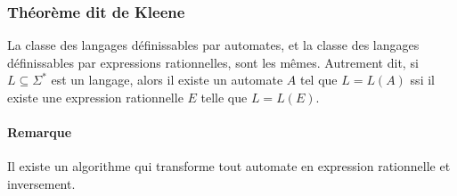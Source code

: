 \documentclass[a4paper]{article}
\begin{document}
  \subsubsection{Théorème dit de Kleene}
  La classe des langages définissables par automates, et la classe des langages
  définissables par expressions rationnelles, sont les mêmes. Autrement dit, si 
  $L \subseteq \Sigma^*$ est un langage, alors il existe un automate $A$ tel
  que $L = L(A)$ ssi il existe une expression rationnelle $E$ telle que $L = L(E)$.\\

  \paragraph{Remarque} Il existe un algorithme qui transforme tout automate
  en expression rationnelle et inversement.
\end{document}
